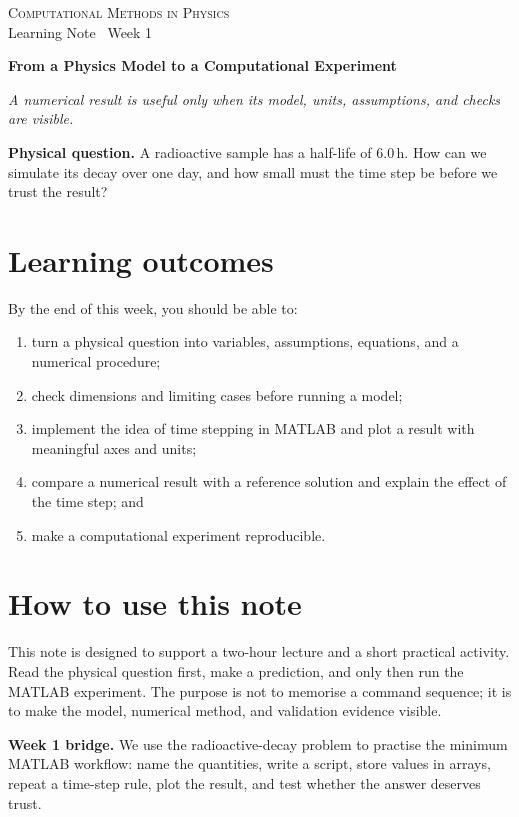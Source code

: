 \documentclass[11pt,a4paper]{article}
\newcommand{\course}{Computational Methods in Physics}
\begin{document}
{\large\textsc{\course}}\\[-2pt]
{\small Learning Note \textbar\ Week 1}\par\vspace{4pt}
{\LARGE\bfseries From a Physics Model to a Computational Experiment}\par\vspace{3pt}
\textit{A numerical result is useful only when its model, units, assumptions, and checks are visible.}

\begin{keybox}
\textbf{Physical question.} A radioactive sample has a half-life of $6.0\,\mathrm{h}$. How can we simulate its decay over one day, and how small must the time step be before we trust the result?
\end{keybox}

\section*{Learning outcomes}
By the end of this week, you should be able to:
\begin{enumerate}[nosep,leftmargin=5mm]
  \item turn a physical question into variables, assumptions, equations, and a numerical procedure;
  \item check dimensions and limiting cases before running a model;
  \item implement the idea of time stepping in MATLAB and plot a result with meaningful axes and units;
  \item compare a numerical result with a reference solution and explain the effect of the time step; and
  \item make a computational experiment reproducible.
\end{enumerate}

\section*{How to use this note}
This note is designed to support a two-hour lecture and a short practical activity. Read the physical question first, make a prediction, and only then run the MATLAB experiment. The purpose is not to memorise a command sequence; it is to make the model, numerical method, and validation evidence visible.

\begin{keybox}
\textbf{Week 1 bridge.} We use the radioactive-decay problem to practise the minimum MATLAB workflow: name the quantities, write a script, store values in arrays, repeat a time-step rule, plot the result, and test whether the answer deserves trust.
\end{keybox}
\end{document}
